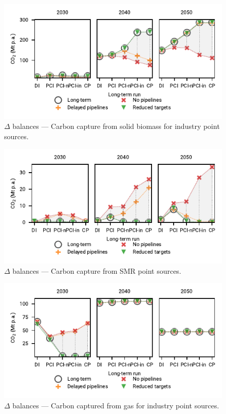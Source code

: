 \documentclass[preprint,12pt,sort&compress]{elsarticle}
\begin{document}
\begin{figure}[htbp]
  \centering
  \includegraphics[width=\linewidth]{delta_balances_solid biomass for industry CC}
  \caption{$\Delta$ balances --- Carbon capture from solid biomass for industry point sources.}
  \label{fig:delta_balances_biomass_industry_cc}
\end{figure}

\begin{figure}[htbp]
  \centering
  \includegraphics[width=\linewidth]{delta_balances_SMR CC}
  \caption{$\Delta$ balances --- Carbon capture from SMR point sources.}
  \label{fig:delta_balances_smr_cc}
\end{figure}

\begin{figure}[htbp]
  \centering
  \includegraphics[width=\linewidth]{delta_balances_gas for industry CC}
  \caption{$\Delta$ balances --- Carbon captured from gas for industry point sources.}
  \label{fig:delta_balances_gas_for_industry}
\end{figure}
\end{document}
